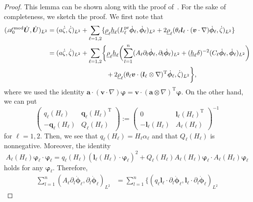\documentclass[11pt,leqno]{article}
\numberwithin{equation}{section}
\numberwithin{figure}{section}
\begin{document}
\begin{proof}
This lemma can be shown along with the proof of~\cite[Lemma 7.4]{DucheneIguchi2020}. 
For the sake of completeness, we sketch the proof. 
We first note that 
%
\begin{align*}
(\mathscr{A}_0^\mathrm{mod}\dot{\bm{U}},\dot{\bm{U}})_{L^2}
&= (a\dot{\zeta},\dot{\zeta})_{L^2}
 + \sum_{\ell=1,2} \{ \underline{\rho}_\ell\underline{h}_\ell (L_\ell^\mathrm{pr}\dot{\bm{\phi}}_\ell, \dot{\bm{\phi}}_\ell)_{L^2}
 + 2\underline{\rho}_\ell (\theta_\ell\bm{l}_\ell\cdot(\bm{v}\cdot\nabla)\dot{\bm{\phi}}_\ell,\dot{\zeta})_{L^2} \} \\
&= (a\dot{\zeta},\dot{\zeta})_{L^2}
 + \sum_{\ell=1,2} \biggl\{ \underline{\rho}_\ell\underline{h}_\ell \biggl(
  \sum_{l=1}^n(A_\ell\partial_l\dot{\bm{\phi}}_\ell,\partial_l\dot{\bm{\phi}}_\ell)_{L^2}
   + (\underline{h}_\ell\delta)^{-2}(C_\ell\dot{\bm{\phi}}_\ell,\dot{\bm{\phi}}_\ell)_{L^2} \biggr) \\
&\makebox[9em]{}
 + 2\underline{\rho}_\ell(\theta_\ell\bm{v}\cdot(\bm{l}_\ell\otimes\nabla)^\mathrm{T}\dot{\bm{\phi}}_\ell, \dot{\zeta})_{L^2}
 \biggr\},
\end{align*}
%
where we used the identity $\bm{a}\cdot(\bm{v}\cdot\nabla)\bm{\varphi} = \bm{v}\cdot(\bm{a}\otimes\nabla)^\mathrm{T}\bm{\varphi}$. 
On the other hand, we can put 
%
\[
\begin{pmatrix}
 q_\ell(H_\ell) & \bm{q}_\ell(H_\ell)^\mathrm{T} \\
 -\bm{q}_\ell(H_\ell) & Q_\ell(H_\ell)
\end{pmatrix}
:= 
\begin{pmatrix}
 0 & \bm{l}_\ell(H_\ell)^\mathrm{T} \\
 -\bm{l}_\ell(H_\ell) & A_\ell(H_\ell)
\end{pmatrix}^{-1}
\]
%
for $\ell=1,2$. 
Then, we see that $q_\ell(H_\ell)=H_\ell\alpha_\ell$ and that $Q_\ell(H_\ell)$ is nonnegative. 
Moreover, the identity 
%
\begin{equation}\label{decomposition-A}
A_\ell(H_\ell)\bm{\varphi}_\ell\cdot\bm{\varphi}_\ell
= q_\ell(H_\ell)(\bm{l}_\ell(H_\ell) \cdot \bm{\varphi}_\ell)^2
 + Q_\ell(H_\ell)A_\ell(H_\ell)\bm{\varphi}_\ell \cdot A_\ell(H_\ell)\bm{\varphi}_\ell
\end{equation}
%
holds for any $\bm{\varphi}_\ell$. 
Therefore, 
%
\begin{align*}
\sum_{l=1}^n(A_\ell\partial_l\dot{\bm{\phi}}_\ell,\partial_l\dot{\bm{\phi}}_\ell)_{L^2}
&= \sum_{l=1}^n\{ (q_\ell\bm{l}_\ell\cdot\partial_l\dot{\bm{\phi}}_\ell,\bm{l}_\ell\cdot\partial_l\dot{\bm{\phi}}_\ell)_{L^2}

\end{align*}
\end{proof}
\end{document}
